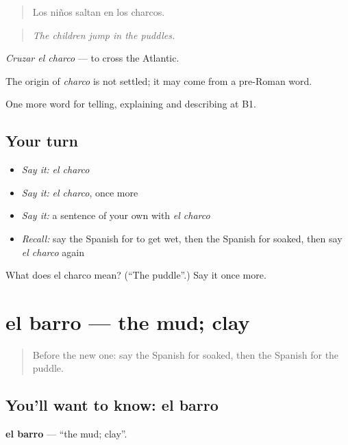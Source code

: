 \begin{quote}
Los niños saltan en los charcos.
\end{quote}

\begin{quote}
\emph{The children jump in the puddles.}
\end{quote}

\emph{Cruzar el charco} — to cross the Atlantic.

\begin{cousinweb}
The origin of \emph{charco} is not settled; it may come from a pre-Roman word.
\end{cousinweb}

\begin{grammarlens}[title={What you've built}]
One more word for telling, explaining and describing at B1.
\end{grammarlens}

\subsection*{Your turn}
\begin{itemize}
\raggedright
  \item \emph{Say it:} \emph{el charco}
  \item \emph{Say it:} \emph{el charco}, once more
  \item \emph{Say it:} a sentence of your own with \emph{el charco}
  \item \emph{Recall:} say the Spanish for to get wet, then the Spanish for soaked, then say \emph{el charco} again
\end{itemize}

\begin{tcolorbox}[breakable,colback=teal!4,colframe=teal!35!black,title={Before you move on}]
What does el charco mean? (\textquotedblleft{}The puddle\textquotedblright{}.) Say it once more.
\end{tcolorbox}
\section[el barro]{el barro — the mud; clay}

\label{lesson:ES-C702-barro}



\begin{quote}
Before the new one: say the Spanish for soaked, then the Spanish for the puddle.
\end{quote}

\subsection*{You'll want to know: el barro}
\textbf{el barro} — \textquotedblleft{}the mud; clay\textquotedblright{}.

